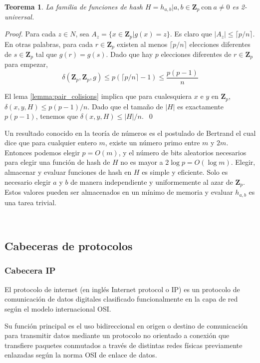 \documentclass[a4paper,12pt, oneside]{article}
\newtheorem{theorem}{Teorema}[section]
\begin{document}
\begin{theorem}
	La familia de funciones de hash $H={h_{a,b} | a, b \in \mathbf{Z}_p \ \text{con} \ a \neq 0}$ es \textit{2-universal}.
\end{theorem}
\begin{proof}
	Para cada $z \in N$, sea $A_z = \{ x \in \mathbf{Z}_p | g(x) = z \}$. Es claro que $|A_z| \leq \lceil p/n \rceil$. En otras palabras, para cada $r \in \mathbf{Z}_p$ existen al menos $\lceil p/n \rceil$ elecciones diferentes de $s \in \mathbf{Z}_p$ tal que $g(r) = g(s)$. Dado que hay $p$ elecciones diferentes de $r \in \mathbf{Z}_p$ para empezar,
	\begin{equation}
		\delta(\mathbf{Z}_p,\mathbf{Z}_p,g) \leq p \left( \lceil p/n \rceil - 1 \right) \leq \frac{p(p-1)}{n}
	\end{equation}
	
	El lema \ref{lemma:pair_colisions} implica que para cualesquiera $x$ e $y$ en $\mathbf{Z}_p$, $\delta(x,y,H) \leq p(p-1)/n$. Dado que el tamaño de $|H|$ es exactamente $p(p-1)$, tenemos que $\delta(x,y,H) \leq |H|/n$. \qed
\end{proof}

Un resultado conocido en la teoría de números es el postulado de Bertrand el cual dice que para cualquier entero $m$, existe un número primo entre $m$ y $2m$. Entonces podemos elegir $p = O(m)$, y el número de bits aleatorios necesarios para elegir una función de hash de $H$ no es mayor a $2 \log p = O(\log m)$. Elegir, almacenar y evaluar funciones de hash en $H$ es simple y eficiente. Solo es necesario elegir $a$ y $b$ de manera independiente y uniformemente al azar de $\mathbf{Z}_p$. Estos valores pueden ser almacenados en un mínimo de memoria y evaluar $h_{a,b}$ es una tarea trivial.

\

\subsection{Cabeceras de protocolos}

\subsubsection{Cabecera IP}
El protocolo de internet (en inglés Internet protocol o IP) es un protocolo de comunicación de datos digitales clasificado funcionalmente en la capa de red según el modelo internacional OSI\cite{rfc791}.

Su función principal es el uso bidireccional en origen o destino de comunicación para transmitir datos mediante un protocolo no orientado a conexión que transfiere paquetes conmutados a través de distintas redes físicas previamente enlazadas según la norma OSI de enlace de datos.
\end{document}
